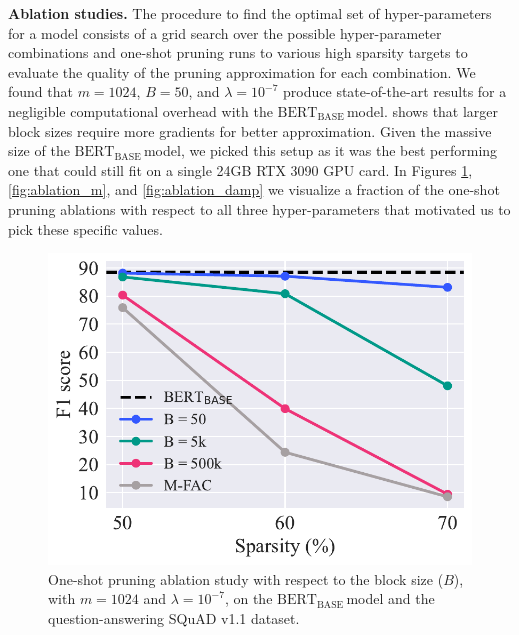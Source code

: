 \documentclass[11pt]{article}
\newcommand{\bert}{$\textrm{BERT}_{\textrm{BASE}}\,$}
\begin{document}
\noindent\textbf{Ablation studies.} The procedure to find the optimal set of hyper-parameters for a model consists of a grid search over the possible hyper-parameter combinations and one-shot pruning runs to various high sparsity targets to evaluate the quality of the pruning approximation for each combination. We found that $m=1024$, $B=50$, and $\lambda=10^{-7}$ produce state-of-the-art results for a negligible computational overhead with the \bert model. \citet{Frantar2021EfficientMA} shows that larger block sizes require more gradients for better approximation. Given the massive size of the \bert model, we picked this setup as it was the best performing one that could still fit on a single 24GB RTX 3090 GPU card. In Figures \ref{fig:ablation_B}, \ref{fig:ablation_m}, and \ref{fig:ablation_damp} we visualize a fraction of the one-shot pruning ablations with respect to all three hyper-parameters that motivated us to pick these specific values.

\begin{figure}
    \centering
    \includegraphics[scale=0.5]{media/ablation_B.pdf}
    \caption{One-shot pruning ablation study with respect to the block size ($B$), with $m = 1024$ and $\lambda = 10^{-7}$, on the \bert model and the question-answering SQuAD v1.1 dataset.}
    \label{fig:ablation_B}
\end{figure}
\end{document}
